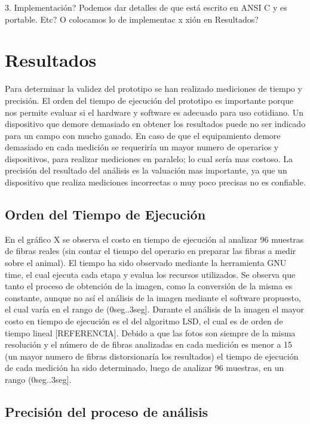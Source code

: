 \documentclass[runningheads,a4paper]{llncs}
\begin{document}
3. Implementación?
Podemos dar detalles de que está escrito en ANSI C y es portable. Etc? O colocamos lo de implementac               x xión en Resultados?

\section{Resultados}

Para determinar la validez del prototipo se han realizado mediciones de tiempo y precisión.
El orden del tiempo de ejecución del prototipo es importante porque nos permite evaluar si el hardware y software es adecuado para uso cotidiano. Un dispositivo que demore demasiado en obtener los resultados puede no ser indicado para un campo con mucho ganado. En caso de que el equipamiento demore demasiado en cada medición se requeriría un mayor numero de operarios y dispositivos, para realizar mediciones en paralelo; lo cual sería mas costoso.
La precisión del resultado del análisis es la valuación mas importante, ya que un dispositivo que realiza mediciones incorrectas o muy poco precisas no es confiable.


\subsection{Orden del Tiempo de Ejecución}
En el gráfico X se observa el costo en tiempo de ejecución al analizar 96 muestras de fibras reales (sin contar el tiempo del operario en preparar las fibras a medir sobre el animal). El tiempo ha sido observado mediante la herramienta GNU time, el cual ejecuta cada etapa y evalua los recursos utilizados. Se observa que tanto el proceso de obtención de la imagen, como la conversión de la misma es constante, aunque no así el análisis de la imagen mediante el software propuesto, el cual varía en el rango de (0seg..3seg].
Durante el análisis de la imagen el mayor costo en tiempo de ejecución es el del algoritmo LSD, el cual es de orden de tiempo lineal [REFERENCIA]. Debido a que las fotos son siempre de la misma resolución y el número de de fibras analizadas en cada medición es menor a 15 (un mayor numero de fibras distorsionaría los resultados) el tiempo de ejecución de cada medición ha sido determinado, luego de analizar 96 muestras, en un rango (0seg..3seg].

\subsection{Precisión del proceso de análisis}
\end{document}
